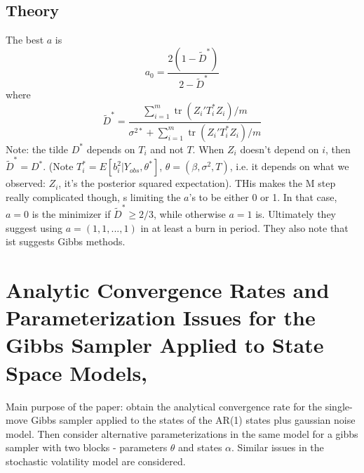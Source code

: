 \documentclass{article}\usepackage[]{graphicx}\usepackage[]{color}
\DeclareMathOperator{\tr}{tr}
\begin{document}
\subsection{Theory}
The best $a$ is
\[
a_0 = \frac{2(1-\tilde{D}^*)}{2 - \tilde{D}^*}
\]
where
\[
\tilde{D}^* = \frac{\sum_{i=1}^m\tr(Z_i'T_i^*Z_i)/m}{\sigma^{2*} + \sum_{i=1}^m\tr(Z_i'T_i^*Z_i)/m}
\]
Note: the tilde $D^*$ depends on $T_i$ and not $T$. When $Z_i$ doesn't depend on $i$, then $\tilde{D}^*=D^*$. (Note $T_i^* = E[b_i^2|Y_{obs}, \theta^*]$, $\theta = (\beta, \sigma^2, T)$, i.e. it depends on what we observed: $Z_i$, it's the posterior squared expectation). THis makes the M step really complicated though, s limiting the $a$'s to be either 0 or 1. In that case, $a=0$ is the minimizer if $\tilde{D}^* \geq 2/3$, while otherwise $a=1$ is. Ultimately they suggest using $a=(1,1,...,1)$ in at least a burn in period. They also note that ist suggests Gibbs methods.

\section{Analytic Convergence Rates and Parameterization Issues for the Gibbs Sampler Applied to State Space Models, \citet{pitt1999analytic}}
Main purpose of the paper: obtain the analytical convergence rate for the single-move Gibbs sampler applied to the states of the AR(1) states plus gaussian noise model. Then consider alternative parameterizations in the same model for a gibbs sampler with two blocks - parameters $\theta$ and states $\alpha$. Similar issues in the stochastic volatility model are considered.
\end{document}
